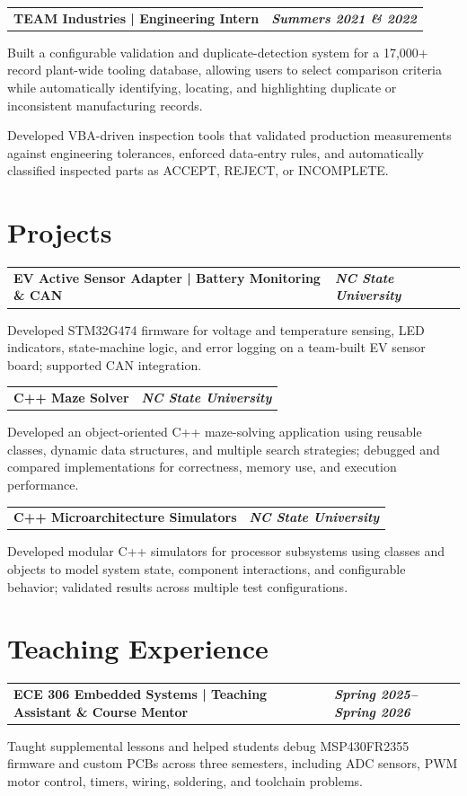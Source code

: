 \documentclass[10pt,letterpaper]{article}
\makeatletter
\newcommand{\resumeentry}[2]{%
  \begin{tabularx}{\textwidth}{@{}X>{\raggedleft\arraybackslash}p{2.40in}@{}}
    \textbf{#1} & \textbf{\textit{#2}}
  \end{tabularx}\vspace{-0.075cm}
}
\makeatother
\begin{document}
\resumeentry{TEAM Industries | Engineering Intern}{Summers 2021 \& 2022}
\begin{resumebullets}
  \item Built a configurable validation and duplicate-detection system for a 17,000+ record plant-wide tooling database, allowing users to select comparison criteria while automatically identifying, locating, and highlighting duplicate or inconsistent manufacturing records.
  \item Developed VBA-driven inspection tools that validated production measurements against engineering tolerances, enforced data-entry rules, and automatically classified inspected parts as ACCEPT, REJECT, or INCOMPLETE.  
\end{resumebullets}

\section{Projects}


\resumeentry{EV Active Sensor Adapter | Battery Monitoring \& CAN}{NC State University}
\begin{resumebullets}
  \item Developed STM32G474 firmware for voltage and temperature sensing, LED indicators, state-machine logic, and error logging on a team-built EV sensor board; supported CAN integration.
\end{resumebullets}

\resumeentry{C++ Maze Solver}{NC State University}
\begin{resumebullets}
  \item Developed an object-oriented C++ maze-solving application using reusable classes, dynamic data structures, and multiple search strategies; debugged and compared implementations for correctness, memory use, and execution performance.
\end{resumebullets}

\resumeentry{C++ Microarchitecture Simulators}{NC State University}
\begin{resumebullets}
  \item Developed modular C++ simulators for processor subsystems using classes and objects to model system state, component interactions, and configurable behavior; validated results across multiple test configurations.
\end{resumebullets}



\section{Teaching Experience}
\resumeentry{ECE 306 Embedded Systems | Teaching Assistant \& Course Mentor}{Spring 2025--Spring 2026}
\begin{resumebullets}
  \item Taught supplemental lessons and helped students debug MSP430FR2355 firmware and custom PCBs across three semesters, including ADC sensors, PWM motor control, timers, wiring, soldering, and toolchain problems.
\end{resumebullets}
\end{document}
